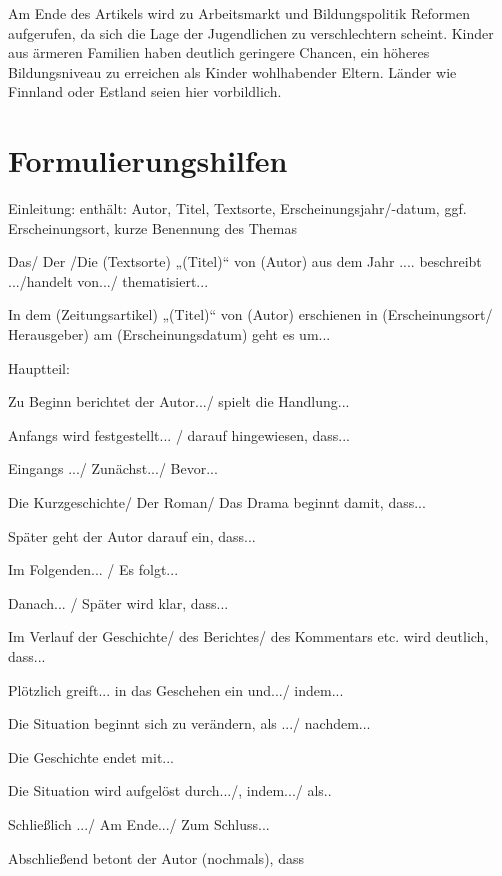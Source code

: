 Am Ende des Artikels wird zu Arbeitsmarkt und Bildungspolitik Reformen aufgerufen, da sich die Lage der Jugendlichen zu verschlechtern scheint. Kinder aus ärmeren Familien haben deutlich geringere Chancen, ein höheres Bildungsniveau zu erreichen als Kinder wohlhabender Eltern. Länder wie Finnland oder Estland seien hier vorbildlich. 
\section{Formulierungshilfen}

Einleitung:
enthält: Autor, Titel, Textsorte, Erscheinungsjahr/-datum, ggf. Erscheinungsort, kurze Benennung des Themas 
\begin{compactitem}
    \item Das/ Der /Die (Textsorte) „(Titel)“ von (Autor) aus dem Jahr .... beschreibt .../handelt von.../ thematisiert...  
    \item In dem (Zeitungsartikel) „(Titel)“ von (Autor) erschienen in (Erscheinungsort/ Herausgeber) am (Erscheinungsdatum) geht es um... 
\end{compactitem}
Hauptteil: 
\begin{compactitem}
    \item  Zu Beginn berichtet der Autor.../ spielt die Handlung... 
    \item  Anfangs wird festgestellt... / darauf hingewiesen, dass...
    \item  Eingangs .../ Zunächst.../ Bevor...
    \item Die Kurzgeschichte/ Der Roman/ Das Drama beginnt damit, dass... 
    \item Später geht der Autor darauf ein, dass... 
    \item  Im Folgenden... / Es folgt...
    \item Danach... / Später wird klar, dass...
    \item Im Verlauf der Geschichte/ des Berichtes/ des Kommentars etc. wird deutlich, dass...
    \item Plötzlich greift... in das Geschehen ein und.../ indem...
    \item  Die Situation beginnt sich zu verändern, als .../ nachdem... 
    \item Die Geschichte endet mit...
    \item Die Situation wird aufgelöst durch.../, indem.../ als..
    \item Schließlich .../ Am Ende.../ Zum Schluss... 
    \item Abschließend betont der Autor (nochmals), dass 
\end{compactitem}


